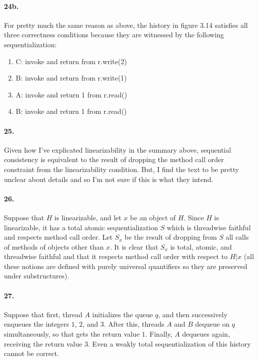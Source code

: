 \documentclass[
]{article}
\begin{document}
\paragraph{24b.} For pretty much the same reason as above, the history in figure 3.14 satisfies all three correctness conditions because they are witnessed by the following sequentialization:
\begin{enumerate}
\item C: invoke and return from r.write(2)
\item B: invoke and return from r.write(1)
\item A: invoke and return 1 from r.read()
\item B: invoke and return 1 from r.read()
\end{enumerate}

\paragraph{25.} Given how I've explicated linearizability in the summary above, sequential consistency is equivalent to the result of dropping the method call order constraint from the linearizability condition.  But, I find the text to be pretty unclear about details and so I'm not sure if this is what they intend.

\paragraph{26.} Suppose that $H$ is linearizable, and let $x$ be an object of $H$. Since $H$ is linearizable, it has a total atomic sequentialization $S$ which is threadwise faithful and respects method call order.  Let $S_x$ be the result of dropping from $S$ all calls of methods of objects other than $x$.  It is clear that $S_x$ is total, atomic, and threadwise faithful and that it respects method call order with respect to $H|x$ (all these notions are defined with purely universal quantifiers so they are preserved under substructures).

\paragraph{27.} Suppose that first, thread $A$ initializes the queue $q$, and then successively enqueues the integers $1$, $2$, and $3$.  After this, threads $A$ and $B$ dequeue on $q$ simultaneously, so that gets the return value $1$.  Finally, $A$ dequeues again, receiving the return value $3$.  Even a weakly total sequentialization of this history cannot be correct.
\end{document}
